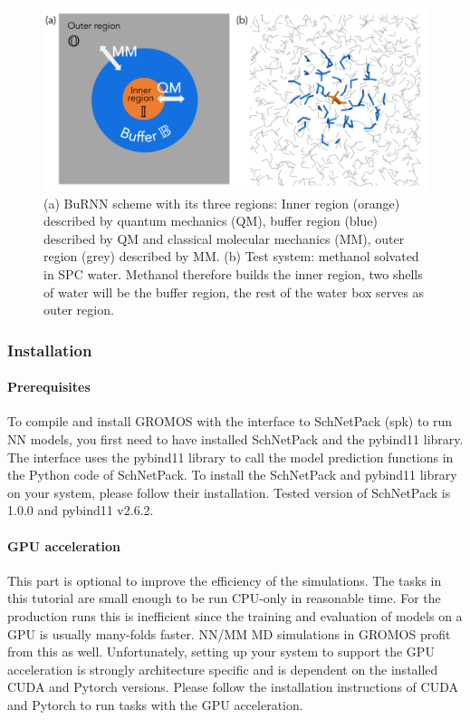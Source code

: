 \begin{figure}[H]
\centering
\includegraphics[scale=.33]{../09_tutorial_06/figures/BuRNN_scheme}
\caption{(a) BuRNN scheme with its three regions: Inner region (orange) described by quantum mechanics (QM), buffer region (blue) described by QM and classical molecular mechanics (MM), outer region (grey) described by MM. (b) Test system: methanol solvated in SPC water. Methanol therefore builds the inner region, two shells of water will be the buffer region, the rest of the water box serves as outer region.}
\label{BuRNN_scheme}
\end{figure}


\subsubsection{Installation}
\paragraph{Prerequisites}
To compile and install GROMOS with the interface to SchNetPack (spk) to run NN models, you first need to have installed SchNetPack and the pybind11 library. The interface uses the pybind11 library to call the model prediction functions in the Python code of SchNetPack. To install the SchNetPack and pybind11 library on your system, please follow their installation. Tested version of SchNetPack is 1.0.0 and pybind11 v2.6.2.

\paragraph{GPU acceleration}
This part is optional to improve the efficiency of the simulations. The tasks in this tutorial are small enough to be run CPU-only in reasonable time. For the production runs this is inefficient since the training and evaluation of models on a GPU is usually many-folds faster. NN/MM MD simulations in GROMOS profit from this as well. Unfortunately, setting up your system to support the GPU acceleration is strongly architecture specific and is dependent on the installed CUDA and Pytorch versions. Please follow the installation instructions of CUDA and Pytorch to run tasks with the GPU acceleration.

